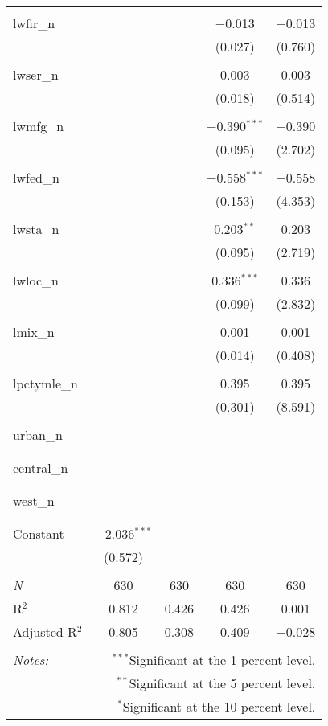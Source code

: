 \begin{tabular}{@{\extracolsep{5pt}}lcccc}
  & & & & \\ 
 lwfir\_n &  &  & $-$0.013 & $-$0.013 \\ 
  &  &  & (0.027) & (0.760) \\ 
  & & & & \\ 
 lwser\_n &  &  & 0.003 & 0.003 \\ 
  &  &  & (0.018) & (0.514) \\ 
  & & & & \\ 
 lwmfg\_n &  &  & $-$0.390$^{***}$ & $-$0.390 \\ 
  &  &  & (0.095) & (2.702) \\ 
  & & & & \\ 
 lwfed\_n &  &  & $-$0.558$^{***}$ & $-$0.558 \\ 
  &  &  & (0.153) & (4.353) \\ 
  & & & & \\ 
 lwsta\_n &  &  & 0.203$^{**}$ & 0.203 \\ 
  &  &  & (0.095) & (2.719) \\ 
  & & & & \\ 
 lwloc\_n &  &  & 0.336$^{***}$ & 0.336 \\ 
  &  &  & (0.099) & (2.832) \\ 
  & & & & \\ 
 lmix\_n &  &  & 0.001 & 0.001 \\ 
  &  &  & (0.014) & (0.408) \\ 
  & & & & \\ 
 lpctymle\_n &  &  & 0.395 & 0.395 \\ 
  &  &  & (0.301) & (8.591) \\ 
  & & & & \\ 
 urban\_n &  &  &  &  \\ 
  &  &  &  &  \\ 
  & & & & \\ 
 central\_n &  &  &  &  \\ 
  &  &  &  &  \\ 
  & & & & \\ 
 west\_n &  &  &  &  \\ 
  &  &  &  &  \\ 
  & & & & \\ 
 Constant & $-$2.036$^{***}$ &  &  &  \\ 
  & (0.572) &  &  &  \\ 
  & & & & \\ 
\textit{N} & 630 & 630 & 630 & 630 \\ 
R$^{2}$ & 0.812 & 0.426 & 0.426 & 0.001 \\ 
Adjusted R$^{2}$ & 0.805 & 0.308 & 0.409 & $-$0.028 \\ 
\hline 
\hline \\[-1.8ex] 
\textit{Notes:} & \multicolumn{4}{r}{$^{***}$Significant at the 1 percent level.} \\ 
 & \multicolumn{4}{r}{$^{**}$Significant at the 5 percent level.} \\ 
 & \multicolumn{4}{r}{$^{*}$Significant at the 10 percent level.} \\ 
\end{tabular} 
